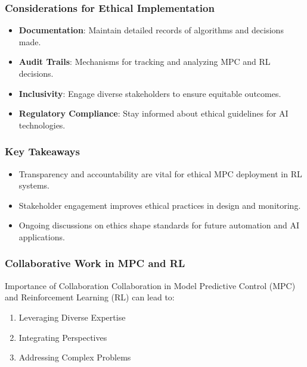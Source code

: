 \documentclass[aspectratio=169]{beamer}
\begin{document}
\begin{frame}[fragile]
    \frametitle{Considerations for Ethical Implementation}
    \begin{itemize}
        \item \textbf{Documentation}: Maintain detailed records of algorithms and decisions made.
        \item \textbf{Audit Trails}: Mechanisms for tracking and analyzing MPC and RL decisions.
        \item \textbf{Inclusivity}: Engage diverse stakeholders to ensure equitable outcomes.
        \item \textbf{Regulatory Compliance}: Stay informed about ethical guidelines for AI technologies.
    \end{itemize}
\end{frame}

\begin{frame}[fragile]
    \frametitle{Key Takeaways}
    \begin{itemize}
        \item Transparency and accountability are vital for ethical MPC deployment in RL systems.
        \item Stakeholder engagement improves ethical practices in design and monitoring.
        \item Ongoing discussions on ethics shape standards for future automation and AI applications.
    \end{itemize}
\end{frame}

\begin{frame}[fragile]
    \frametitle{Collaborative Work in MPC and RL}
    \begin{block}{Importance of Collaboration}
        Collaboration in Model Predictive Control (MPC) and Reinforcement Learning (RL) can lead to:
        \begin{enumerate}
            \item Leveraging Diverse Expertise
            \item Integrating Perspectives
            \item Addressing Complex Problems
        \end{enumerate}
    \end{block}
\end{frame}
\end{document}
